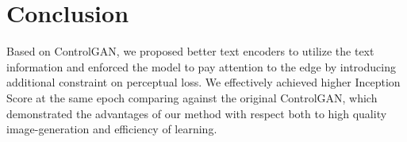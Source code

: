 \documentclass[10pt,twocolumn,letterpaper]{article}
\begin{document}
\section{Conclusion}
Based on ControlGAN\cite{li2019controllable}, we proposed better text encoders to utilize the text information and enforced the model to pay attention to the edge by introducing additional constraint on perceptual loss. We effectively achieved  higher  Inception  Score at the same epoch comparing against the original ControlGAN\cite{li2019controllable}, which demonstrated the advantages of our method with respect both to high quality image-generation and efficiency of learning. 

{\small


}
\end{document}
